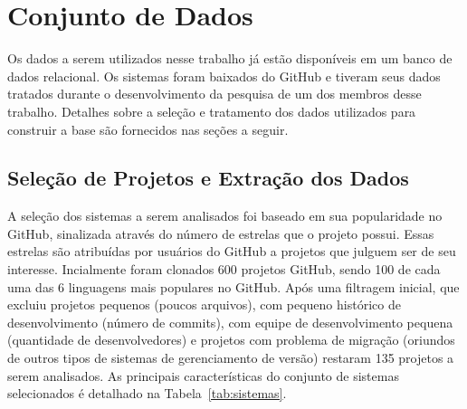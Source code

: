 \documentclass[12pt]{article}
\begin{document}
%

\section{Conjunto de Dados}

Os dados a serem utilizados nesse trabalho já estão disponíveis em um banco de dados relacional. Os sistemas foram baixados do GitHub e tiveram seus dados tratados durante o desenvolvimento da pesquisa de um dos membros desse trabalho. Detalhes sobre a seleção e tratamento dos dados utilizados para construir a base são fornecidos nas seções a seguir.

\subsection {Seleção de Projetos e Extração dos Dados}
A seleção dos sistemas a serem analisados foi baseado em sua popularidade no GitHub, sinalizada através do número de estrelas que o projeto possui. Essas estrelas são atribuídas por usuários do GitHub a projetos que julguem ser de seu interesse. Incialmente foram clonados 600 projetos GitHub, sendo 100 de cada uma das 6 linguagens mais populares no GitHub. Após uma filtragem inicial, que excluiu projetos pequenos (poucos arquivos),  com pequeno histórico de desenvolvimento (número de commits), com equipe de desenvolvimento pequena (quantidade de desenvolvedores) e projetos com problema de migração (oriundos de outros tipos de sistemas de gerenciamento de versão) restaram 135 projetos a serem analisados.
As principais características do  conjunto de sistemas selecionados é detalhado na Tabela~\ref{tab:sistemas}.
\end{document}
